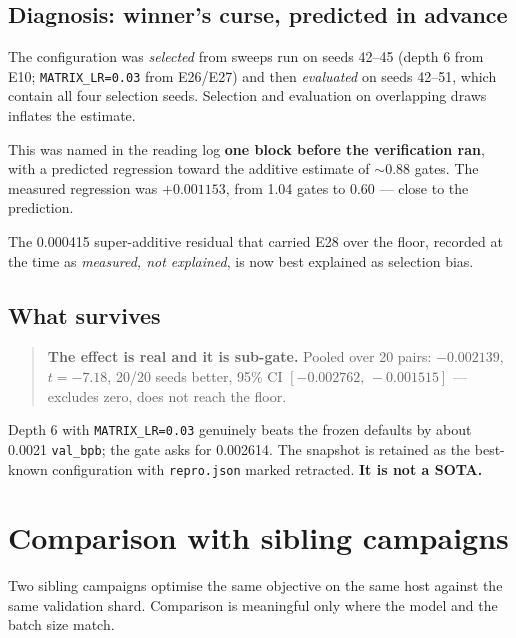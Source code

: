 \documentclass[11pt,a4paper]{article}
\newcommand{\bpb}{\texttt{val\_bpb}}
\begin{document}
\subsection{Diagnosis: winner's curse, predicted in advance}

The configuration was \emph{selected} from sweeps run on seeds 42--45 (depth 6 from E10;
\texttt{MATRIX\_LR=0.03} from E26/E27) and then \emph{evaluated} on seeds 42--51, which
contain all four selection seeds. Selection and evaluation on overlapping draws inflates the
estimate.

This was named in the reading log \textbf{one block before the verification ran}, with a
predicted regression toward the additive estimate of $\sim$0.88 gates. The measured
regression was $+\num{0.001153}$, from 1.04 gates to 0.60 --- close to the prediction.

The \num{0.000415} super-additive residual that carried E28 over the floor, recorded at the
time as \emph{measured, not explained}, is now best explained as selection bias.

\subsection{What survives}

\begin{quote}
\textbf{The effect is real and it is sub-gate.} Pooled over 20 pairs:
$-\num{0.002139}$, $t=-7.18$, 20/20 seeds better, 95\% CI
$[-\num{0.002762},\,-\num{0.001515}]$ --- excludes zero, does not reach the floor.
\end{quote}

Depth 6 with \texttt{MATRIX\_LR=0.03} genuinely beats the frozen defaults by about
\num{0.0021} \bpb{}; the gate asks for \num{0.002614}. The snapshot is retained as the
best-known configuration with \texttt{repro.json} marked retracted. \textbf{It is not a
SOTA.}

\section{Comparison with sibling campaigns}

Two sibling campaigns optimise the same objective on the same host against the same
validation shard. Comparison is meaningful only where the model and the batch size match.
\end{document}
